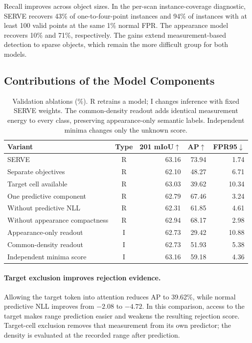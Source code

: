 \documentclass{article}
\begin{document}
Recall improves across object sizes. In the per-scan instance-coverage diagnostic, SERVE recovers 43\% of one-to-four-point instances and 94\% of instances with at least 100 valid points at the same 1\% normal FPR. The appearance model recovers 10\% and 71\%, respectively. The gains extend measurement-based detection to sparse objects, which remain the more difficult group for both models.

\subsection{Contributions of the Model Components}
\begin{table}[t]
\caption{Validation ablations (\%). R retrains a model; I changes inference with fixed SERVE weights. The common-density readout adds identical measurement energy to every class, preserving appearance-only semantic labels. Independent minima changes only the unknown score.}
\label{tab:ablation}
\centering
\begin{tabular}{lcrrr}
\toprule
Variant & Type & 201 mIoU$\uparrow$ & AP$\uparrow$ & FPR95$\downarrow$\\
\midrule
SERVE & R & 63.16 & 73.94 & 1.74\\
Separate objectives & R & 62.10 & 48.27 & 6.71\\
Target cell available & R & 63.03 & 39.62 & 10.34\\
One predictive component & R & 62.79 & 67.46 & 3.24\\
Without predictive NLL & R & 62.31 & 61.85 & 4.61\\
Without appearance compactness & R & 62.94 & 68.17 & 2.98\\
Appearance-only readout & I & 62.73 & 29.42 & 10.88\\
Common-density readout & I & 62.73 & 51.93 & 5.38\\
Independent minima score & I & 63.16 & 59.18 & 4.36\\
\bottomrule
\end{tabular}
\end{table}

\paragraph{Target exclusion improves rejection evidence.}
Allowing the target token into attention reduces AP to 39.62\%, while normal predictive NLL improves from $-2.08$ to $-4.72$. In this comparison, access to the target makes range prediction easier and weakens the resulting rejection score. Target-cell exclusion removes that measurement from its own predictor; the density is evaluated at the recorded range after prediction.
\end{document}

